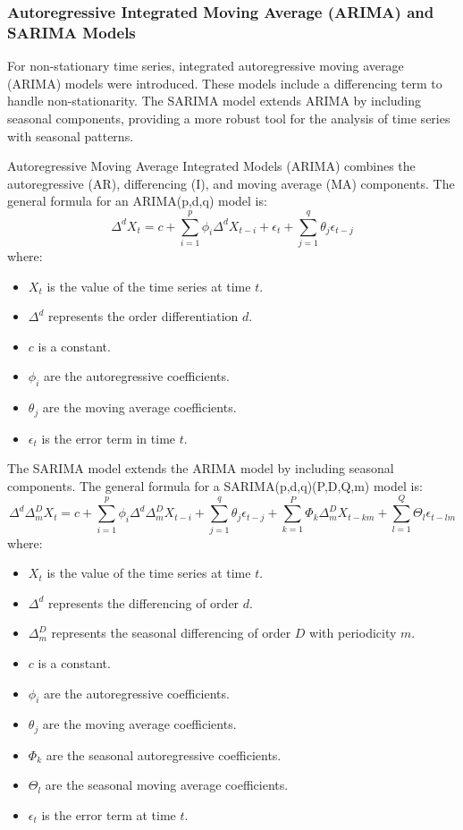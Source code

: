\subsubsection{Autoregressive Integrated Moving Average (ARIMA) and SARIMA Models}

For non-stationary time series, integrated autoregressive moving average (ARIMA) models were introduced. These models include a differencing term to handle non-stationarity. The SARIMA model extends ARIMA by including seasonal components, providing a more robust tool for the analysis of time series with seasonal patterns.

Autoregressive Moving Average Integrated Models (ARIMA) combines the autoregressive (AR), differencing (I), and moving average (MA) components. The general formula for an ARIMA(p,d,q) model is:
\[
\Delta^d X_t = c + \sum_{i=1}^{p} \phi_i \Delta^d X_{t-i} + \epsilon_t + \sum_{j=1}^{q} \theta_j \epsilon_{t-j}
\]
where:
\begin{itemize}
    \item \( X_t \) is the value of the time series at time \( t \).
    \item \( \Delta^d \) represents the order differentiation \( d \).
    \item \( c \) is a constant.
    \item \( \phi_i \) are the autoregressive coefficients.
    \item \( \theta_j \) are the moving average coefficients.
    \item \( \epsilon_t \) is the error term in time \( t \).
\end{itemize}

The SARIMA model extends the ARIMA model by including seasonal components. The general formula for a SARIMA(p,d,q)(P,D,Q,m) model is:
\[
\Delta^d \Delta_m^D X_t = c + \sum_{i=1}^{p} \phi_i \Delta^d \Delta_m^D X_{t-i} + \sum_{j=1}^{q} \theta_j \epsilon_{t-j} + \sum_{k=1}^{P} \Phi_k \Delta_m^D X_{t-km} + \sum_{l=1}^{Q} \Theta_l \epsilon_{t-lm}
\]
where:
\begin{itemize}
    \item \( X_t \) is the value of the time series at time \( t \).
    \item \( \Delta^d \) represents the differencing of order \( d \).
    \item \( \Delta_m^D \) represents the seasonal differencing of order \( D \) with periodicity \( m \).
    \item \( c \) is a constant.
    \item \( \phi_i \) are the autoregressive coefficients.
    \item \( \theta_j \) are the moving average coefficients.
    \item \( \Phi_k \) are the seasonal autoregressive coefficients.
    \item \( \Theta_l \) are the seasonal moving average coefficients.
    \item \( \epsilon_t \) is the error term at time \( t \).
\end{itemize}
\vspace{10pt}

